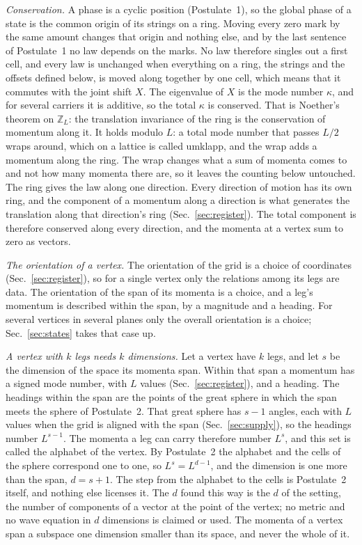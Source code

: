 \documentclass[aps,prd,twocolumn,superscriptaddress,nofootinbib]{revtex4-2}
\begin{document}
\textit{Conservation.} A phase is a cyclic position (Postulate~1), so the global phase of a state is the common origin of its strings on a ring. Moving every zero mark by the same amount changes that origin and nothing else, and by the last sentence of Postulate~1 no law depends on the marks. No law therefore singles out a first cell, and every law is unchanged when everything on a ring, the strings and the offsets defined below, is moved along together by one cell, which means that it commutes with the joint shift $X$. The eigenvalue of $X$ is the mode number $\kappa$, and for several carriers it is additive, so the total $\kappa$ is conserved. That is Noether's theorem on $\mathbb{Z}_L$: the translation invariance of the ring is the conservation of momentum along it. It holds modulo $L$: a total mode number that passes $L/2$ wraps around, which on a lattice is called umklapp, and the wrap adds a momentum along the ring. The wrap changes what a sum of momenta comes to and not how many momenta there are, so it leaves the counting below untouched. The ring gives the law along one direction. Every direction of motion has its own ring, and the component of a momentum along a direction is what generates the translation along that direction's ring (Sec.~\ref{sec:register}). The total component is therefore conserved along every direction, and the momenta at a vertex sum to zero as vectors.

\textit{The orientation of a vertex.} The orientation of the grid is a choice of coordinates (Sec.~\ref{sec:register}), so for a single vertex only the relations among its legs are data. The orientation of the span of its momenta is a choice, and a leg's momentum is described within the span, by a magnitude and a heading. For several vertices in several planes only the overall orientation is a choice; Sec.~\ref{sec:states} takes that case up.

\textit{A vertex with $k$ legs needs $k$ dimensions.} Let a vertex have $k$ legs, and let $s$ be the dimension of the space its momenta span. Within that span a momentum has a signed mode number, with $L$ values (Sec.~\ref{sec:register}), and a heading. The headings within the span are the points of the great sphere in which the span meets the sphere of Postulate~2. That great sphere has $s-1$ angles, each with $L$ values when the grid is aligned with the span (Sec.~\ref{sec:supply}), so the headings number $L^{s-1}$. The momenta a leg can carry therefore number $L^{s}$, and this set is called the alphabet of the vertex. By Postulate~2 the alphabet and the cells of the sphere correspond one to one, so $L^{s} = L^{d-1}$, and the dimension is one more than the span, $d = s+1$. The step from the alphabet to the cells is Postulate~2 itself, and nothing else licenses it. The $d$ found this way is the $d$ of the setting, the number of components of a vector at the point of the vertex; no metric and no wave equation in $d$ dimensions is claimed or used. The momenta of a vertex span a subspace one dimension smaller than its space, and never the whole of it.
\end{document}
